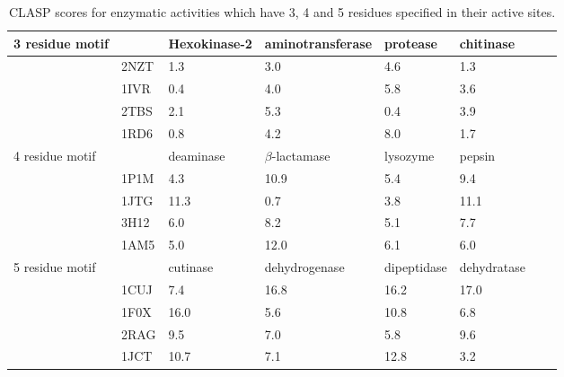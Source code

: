 \begin{center} 
\begin{table*} 
\caption {CLASP scores for enzymatic activities which have 3, 4 and 5 residues specified in their active sites. 
}  
\begin{tabular}{|l|l|l|l|l|l|l|l|}
\hline
\multirow{4}{*}{3 residue motif} & & Hexokinase-2 & aminotransferase&  protease & chitinase \\
\hline 
 &2NZT &      1.3 &      3.0 &      4.6 &      1.3 \\
 &1IVR &      0.4 &      4.0 &      5.8 &      3.6 \\
 &2TBS &      2.1 &      5.3 &      0.4 &      3.9 \\
 &1RD6 &      0.8 &      4.2 &      8.0 &      1.7 \\
 \hline
\multirow{4}{*}{4 residue motif} & & deaminase & $\beta$-lactamase& lysozyme & pepsin \\
\hline 
 &1P1M &      4.3 &     10.9 &      5.4 &      9.4 \\ 
 &1JTG &     11.3 &      0.7 &      3.8 &     11.1 \\ 
 &3H12 &      6.0 &      8.2 &      5.1 &      7.7 \\ 
 &1AM5 &      5.0 &     12.0 &      6.1 &      6.0 \\ 
\hline 
\multirow{4}{*}{5 residue motif} & & cutinase & dehydrogenase & dipeptidase & dehydratase \\
\hline 
 &1CUJ &      7.4 &     16.8 &     16.2 &     17.0 \\ 
 &1F0X &     16.0 &      5.6 &     10.8 &      6.8 \\ 
 &2RAG &      9.5 &      7.0 &      5.8 &      9.6 \\ 
 &1JCT &     10.7 &      7.1 &     12.8 &      3.2 \\ 
\hline 
\end{tabular} \label{table345}  
\end{table*} 
\end{center} 
